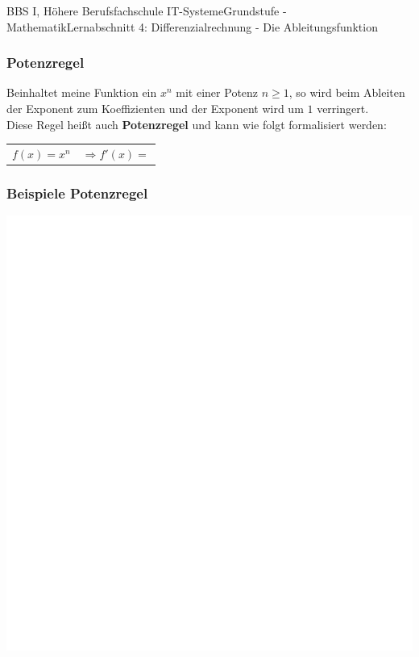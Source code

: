 \documentclass[11pt,twocolumn,oneside,openany,headings=optiontotoc,11pt,numbers=noenddot]{article}
\begin{document}
\begin{worksheet}{BBS I, Höhere Berufsfachschule IT-Systeme}{Grundstufe - Mathematik}{Lernabschnitt 4: Differenzialrechnung - Die Ableitungsfunktion}
		\subsubsection{Potenzregel}
		Beinhaltet meine Funktion ein \(x^n\) mit einer Potenz \(n \geq 1\), so wird beim Ableiten der Exponent zum Koeffizienten und der Exponent wird um \(1\) verringert.\\
		Diese Regel heißt auch \textbf{Potenzregel} und kann wie folgt formalisiert werden:
		\begin{framed}
			\noindent
			\begin{tabularx}{0.7\textwidth}{lX}
				\(f(x) = x^n\) & \(\Rightarrow f'(x) = \)
			\end{tabularx}
		\end{framed}
		\subsubsection*{Beispiele Potenzregel}
		\includegraphics[scale=0.2]{../../empty.jpg}\\

\end{worksheet}
\end{document}
